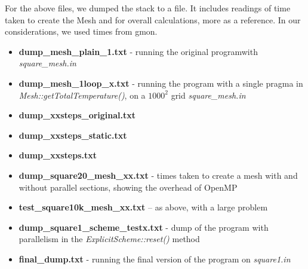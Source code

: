 \documentclass[11pt,journal]{IEEEtran}
\begin{document}
	For the above files, we dumped the stack to a file. It includes readings of time taken to create the Mesh and for overall calculations, more as a reference. In our considerations, we used times from gmon.
	\begin{itemize}
		\item \textbf{dump\_mesh\_plain\_1.txt} - running the original programwith \emph{square\_mesh.in}
		\item \textbf{dump\_mesh\_1loop\_x.txt} - running the program with a single pragma in \emph{Mesh::getTotalTemperature()}, on a $1000^2$ grid \emph{square\_mesh.in}
		\item \textbf{dump\_xxsteps\_original.txt} 
		\item \textbf{dump\_xxsteps\_static.txt}
		\item \textbf{dump\_xxsteps.txt}
		\item \textbf{dump\_square20\_mesh\_xx.txt} - times taken to create a mesh with and without parallel sections, showing the overhead of OpenMP
		\item \textbf{test\_square10k\_mesh\_xx.txt} -- as above, with a large problem
		\item \textbf{dump\_square1\_scheme\_testx.txt} - dump of the program with parallelism in the \emph{ExplicitScheme::reset()} method
		\item \textbf{final\_dump.txt} - running the final version of the program on \emph{square1.in}
		
	\end{itemize}


	
\end{document}
